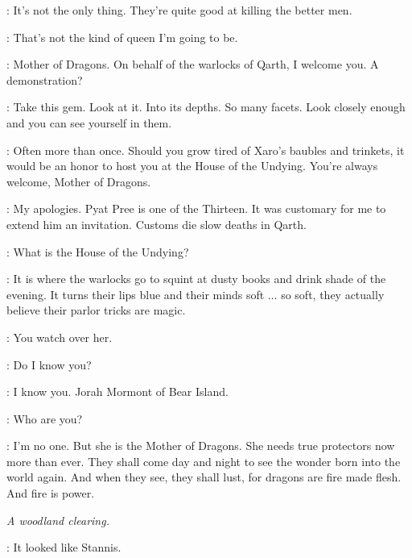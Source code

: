 \JORAH: It's not the only thing. They're quite good at killing the better men. 

\DAENERYS: That's not the kind of queen I'm going to be. 


\PYAT: Mother of Dragons. On behalf of the warlocks of Qarth, I welcome you. A demonstration? 


\PYAT: Take this gem. Look at it. Into its depths. So many facets. Look closely enough and you can see yourself in them. 


\PYAT: Often more than once. Should you grow tired of Xaro's baubles and trinkets, it would be an honor to host you at the House of the Undying. You're always welcome, Mother of Dragons. 


\XARO: My apologies. Pyat Pree is one of the Thirteen. It was customary for me to extend him an invitation. Customs die slow deaths in Qarth. 

\DAENERYS: What is the House of the Undying? 

\XARO: It is where the warlocks go to squint at dusty books and drink shade of the evening. It turns their lips blue and their minds soft $\ldots$ so soft, they actually believe their parlor tricks are magic. 


\QUAITHE: You watch over her. 

\JORAH: Do I know you? 

\QUAITHE: I know you. Jorah Mormont of Bear Island. 

\JORAH: Who are you? 

\QUAITHE: I'm no one. But she is the Mother of Dragons. She needs true protectors now more than ever. They shall come day and night to see the wonder born into the world again. And when they see, they shall lust, for dragons are fire made flesh. And fire is power. 



\scene

\textit{A woodland clearing.} 


\BRIENNE: It looked like Stannis. 

